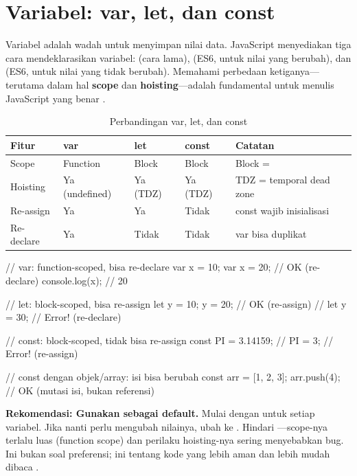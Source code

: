 ﻿\section{Variabel: var, let, dan const}

Variabel adalah wadah untuk menyimpan nilai data. JavaScript menyediakan tiga cara mendeklarasikan variabel:  (cara lama),  (ES6, untuk nilai yang berubah), dan  (ES6, untuk nilai yang tidak berubah). Memahami perbedaan ketiganya---terutama dalam hal \textbf{scope} dan \textbf{hoisting}---adalah fundamental untuk menulis JavaScript yang benar \cite{jsInfo}.

\begin{table}[H]
\centering
\begin{tabular}{|P{2cm}|P{2.5cm}|P{2.5cm}|P{2cm}|P{3cm}|}
\hline
\textbf{Fitur} & \textbf{var} & \textbf{let} & \textbf{const} & \textbf{Catatan} \\
\hline
Scope & Function & Block & Block & Block = \code{\{ \}} \\
\hline
Hoisting & Ya (undefined) & Ya (TDZ) & Ya (TDZ) & TDZ = temporal dead zone \\
\hline
Re-assign & Ya & Ya & Tidak & const wajib inisialisasi \\
\hline
Re-declare & Ya & Tidak & Tidak & var bisa duplikat \\
\hline
\end{tabular}
\caption{Perbandingan var, let, dan const}
\end{table}

\begin{webcode}[language=JavaScript, caption={Perbedaan var, let, dan const}]
// var: function-scoped, bisa re-declare
var x = 10;
var x = 20;  // OK (re-declare)
console.log(x); // 20

// let: block-scoped, bisa re-assign
let y = 10;
y = 20;      // OK (re-assign)
// let y = 30; // Error! (re-declare)

// const: block-scoped, tidak bisa re-assign
const PI = 3.14159;
// PI = 3;   // Error! (re-assign)

// const dengan objek/array: isi bisa berubah
const arr = [1, 2, 3];
arr.push(4); // OK (mutasi isi, bukan referensi)
\end{webcode}

\begin{konsep}
\textbf{Rekomendasi: Gunakan  sebagai default.} Mulai dengan  untuk setiap variabel. Jika nanti perlu mengubah nilainya, ubah ke . Hindari ---scope-nya terlalu luas (function scope) dan perilaku hoisting-nya sering menyebabkan bug. Ini bukan soal preferensi; ini tentang kode yang lebih aman dan lebih mudah dibaca \cite{mdnJsGuide}.
\end{konsep}

